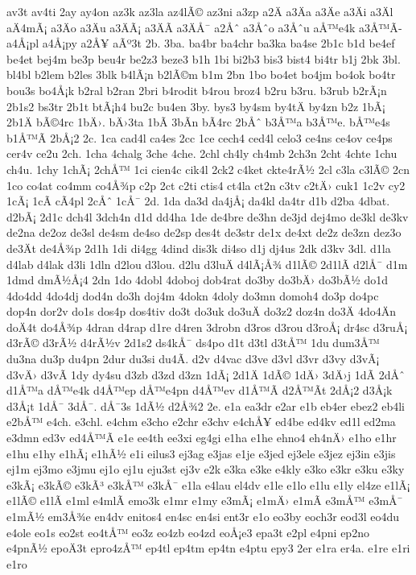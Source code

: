 {av3t
av4ti
2ay
ay4on
az3k
az3la
az4lÃ©
az3ni
a3zp
a2Ä
a3Äa
a3Äe
a3Äi
a3Äl
aÄ4mÃ¡
a3Äo
a3Äu
a3ÄÃ¡
a3ÄÃ­
a3ÄÅ¯
a2Åˆ
a3Åˆo
a3Åˆu
aÅ™e4k
a3Å™Ã­
a4Å¡pl
a4Å¡py
a2Å¥
aÃº3t
2b.
3ba.
ba4br
ba4chr
ba3ka
ba4se
2b1c
b1d
be4ef
be4et
bej4m
be3p
beu4r
be2z3
beze3
b1h
1bi
bi2b3
bis3
bist4
bi4tr
b1j
2bk
3bl.
bl4bl
b2lem
b2les
3blk
b4lÃ¡n
b2lÃ©m
b1m
2bn
1bo
bo4et
bo4jm
bo4ok
bo4tr
bou3s
bo4Å¡k
b2ral
b2ran
2bri
b4rodit
b4rou
broz4
b2ru
b3ru.
b3rub
b2rÃ¡n
2b1s2
bs3tr
2b1t
btÃ¡h4
bu2c
bu4en
3by.
bys3
by4sm
by4tÄ
by4zn
b2z
1bÃ¡
2b1Ä
bÃ©4rc
1bÄ›.
bÄ›3ta
1bÃ­
3bÃ­n
bÃ­4rc
2bÅˆ
b3Å™a
b3Å™e.
bÅ™e4s
b1Å™Ã­
2bÅ¡2
2c.
1ca
cad4l
ca4es
2cc
1ce
cech4
ced4l
celo3
ce4ns
ce4ov
ce4ps
cer4v
ce2u
2ch.
1cha
4chalg
3che
4che.
2chl
ch4ly
ch4mb
2ch3n
2cht
4chte
1chu
ch4u.
1chy
1chÃ¡
2chÅ™
1ci
cien4c
cik4l
2ck2
c4ket
ckte4rÃ½
2cl
c3la
c3lÃ©
2cn
1co
co4at
co4mm
co4Å¾p
c2p
2ct
c2ti
ctis4
ct4la
ct2n
c3tv
c2tÄ›
cuk1
1c2v
cy2
1cÃ¡
1cÃ­
cÃ­4pl
2cÅˆ
1cÅ¯
2d.
1da
da3d
da4jÅ¡
da4kl
da4tr
d1b
d2ba
4dbat.
d2bÃ¡
2d1c
dch4l
3dch4n
d1d
dd4ha
1de
de4bre
de3hn
de3jd
dej4mo
de3kl
de3kv
de2na
de2oz
de3sl
de4sm
de4so
de2sp
des4t
de3str
de1x
de4xt
de2z
de3zn
dez3o
de3Ät
de4Å¾p
2d1h
1di
di4gg
4dind
dis3k
di4so
d1j
dj4us
2dk
d3kv
3dl.
d1la
d4lab
d4lak
d3li
1dln
d2lou
d3lou.
d2lu
d3luÄ
d4lÃ¡Å¾
d1lÃ©
2d1lÃ­
d2lÅ¯
d1m
1dmd
dmÃ½Å¡4
2dn
1do
4dobl
4doboj
dob4rat
do3by
do3bÄ›
do3bÃ½
do1d
4do4dd
4do4dj
dod4n
do3h
doj4m
4dokn
4doly
do3mn
domoh4
do3p
do4pc
dop4n
dor2v
do1s
dos4p
dos4tiv
do3t
do3uk
do3uÄ
do3z2
doz4n
do3Ä
4do4Än
doÄ4t
do4Å¾p
4dran
d4rap
d1re
d4ren
3drobn
d3ros
d3rou
d3roÅ¡
dr4sc
d3ruÅ¡
d3rÃ©
d3rÃ½
d4rÃ½v
2d1s2
ds4kÅ¯
ds4po
d1t
d3tl
d3tÅ™
1du
dum3Å™
du3na
du3p
du4pn
2dur
du3si
du4Ã­.
d2v
d4vac
d3ve
d3vl
d3vr
d3vy
d3vÃ¡
d3vÄ›
d3vÃ­
1dy
dy4su
d3zb
d3zd
d3zn
1dÃ¡
2d1Ä
1dÃ©
1dÄ›
3dÄ›j
1dÃ­
2dÅˆ
d1Å™a
dÅ™e4k
d4Å™ep
dÅ™e4pn
d4Å™ev
d1Å™Ã­
d2Å™Ã­t
2dÅ¡2
d3Å¡k
d3Å¡t
1dÅ¯
3dÅ¯.
dÅ¯3s
1dÃ½
d2Å¾2
2e.
e1a
ea3dr
e2ar
e1b
eb4er
ebez2
eb4li
e2bÅ™
e4ch.
e3chl.
e4chm
e3cho
e2chr
e3chv
e4chÅ¥
ed4be
ed4kv
ed1l
ed2ma
e3dmn
ed3v
ed4Å™Ã­
e1e
ee4th
ee3xi
eg4gi
e1ha
e1he
ehno4
eh4nÄ›
e1ho
e1hr
e1hu
e1hy
e1hÃ¡
e1hÃ½
e1i
eilus3
ej3ag
e3jas
e1je
e3jed
ej3ele
e3jez
ej3in
e3jis
ej1m
ej3mo
e3jmu
ej1o
ej1u
eju3st
ej3v
e2k
e3ka
e3ke
e4kly
e3ko
e3kr
e3ku
e3ky
e3kÃ¡
e3kÃ©
e3kÃ³
e3kÅ™
e3kÅ¯
e1la
e4lau
el4dv
e1le
e1lo
e1lu
e1ly
el4ze
e1lÃ¡
e1lÃ©
e1lÃ­
e1ml
e4mlÃ­
emo3k
e1mr
e1my
e3mÃ¡
e1mÄ›
e1mÃ­
e3mÅ™
e3mÅ¯
e1mÃ½
em3Å¾e
en4dv
enitos4
en4sc
en4si
ent3r
e1o
eo3by
eoch3r
eod3l
eo4du
e4ole
eo1s
eo2st
eo4tÅ™
eo3z
eo4zb
eo4zd
eoÅ¡e3
epa3t
e2pl
e4pni
ep2no
e4pnÃ½
epoÄ3t
epro4zÅ™
ep4tl
ep4tm
ep4tn
e4ptu
epy3
2er
e1ra
er4a.
e1re
e1ri
e1ro
}

